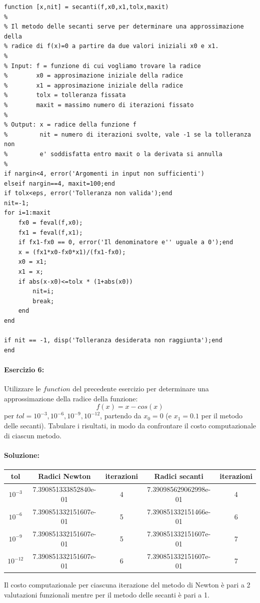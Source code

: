 \documentclass[12pt]{article}
\begin{document}
\begin{lstlisting}[frame=single]
function [x,nit] = secanti(f,x0,x1,tolx,maxit)
% 
% Il metodo delle secanti serve per determinare una approssimazione della
% radice di f(x)=0 a partire da due valori iniziali x0 e x1.
% 
% Input: f = funzione di cui vogliamo trovare la radice
%        x0 = approsimazione iniziale della radice
%        x1 = approsimazione iniziale della radice
%        tolx = tolleranza fissata
%        maxit = massimo numero di iterazioni fissato
%
% Output: x = radice della funzione f
%         nit = numero di iterazioni svolte, vale -1 se la tolleranza non
%         e' soddisfatta entro maxit o la derivata si annulla
%
if nargin<4, error('Argomenti in input non sufficienti')
elseif nargin==4, maxit=100;end
if tolx<eps, error('Tolleranza non valida');end
nit=-1;
for i=1:maxit
    fx0 = feval(f,x0);
    fx1 = feval(f,x1);
    if fx1-fx0 == 0, error('Il denominatore e'' uguale a 0');end
    x = (fx1*x0-fx0*x1)/(fx1-fx0);
    x0 = x1;
    x1 = x;
    if abs(x-x0)<=tolx * (1+abs(x0))
        nit=i;
        break;
    end
end

if nit == -1, disp('Tolleranza desiderata non raggiunta');end
end
\end{lstlisting}
\paragraph{Esercizio 6:}Utilizzare le \(function\) del precedente esercizio per determinare una approssimazione della radice della funzione:
$$f(x)=x-cos(x)$$
per \(tol = 10^{-3}, 10^{-6}, 10^{-9}, 10^{-12}\), partendo da \(x_0 = 0\) (e \(x_1 = 0.1\) per il metodo delle secanti). 
Tabulare i risultati, in modo da confrontare il costo computazionale di ciascun metodo.
\paragraph{Soluzione:}

\begin{center}
    \begin{tabular}{|| c || c | c || c | c||} 
        \hline
        tol & Radici Newton & iterazioni & Radici secanti & iterazioni\\
        \hline
        \(10^{-3}\) & 7.390851333852840e-01 & 4 & 7.390985629062998e-01 & 4\\
        \hline
        \(10^{-6}\) & 7.390851332151607e-01 & 5 & 7.390851332151466e-01 & 6\\
        \hline
        \(10^{-9}\) & 7.390851332151607e-01 & 5 & 7.390851332151607e-01 & 7\\
        \hline
        \(10^{-12}\) & 7.390851332151607e-01 & 6 & 7.390851332151607e-01 & 7\\
        \hline
    \end{tabular}
\end{center}
Il costo computazionale per ciascuna iterazione del metodo di Newton è pari a 2 valutazioni funzionali mentre per il metodo delle secanti è pari a 1.
\end{document}
